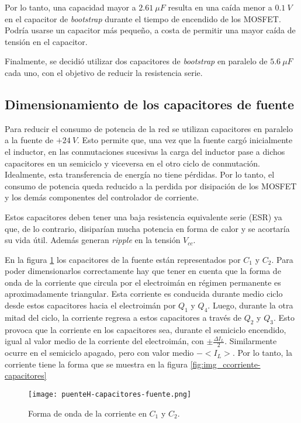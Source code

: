 \noindent Por lo tanto, una capacidad mayor a $2.61 \:\mu F$ resulta en una caída menor a $0.1\:V$ en el capacitor de \textsl{bootstrap} durante el tiempo de encendido de los MOSFET. Podría usarse un capacitor más pequeño, a costa de permitir una mayor caída de tensión en el capacitor. 

\noindent Finalmente, se decidió utilizar dos capacitores de \textsl{bootstrap} en paralelo de $5.6 \:\mu F$ cada uno, con el objetivo de reducir la resistencia serie.

\subsection{Dimensionamiento de los capacitores de fuente}

\noindent Para reducir el consumo de potencia de la red se utilizan capacitores en paralelo a la fuente de $+24\:V$. Esto permite que, una vez que la fuente cargó inicialmente el inductor, en las conmutaciones sucesivas la carga del inductor pase a dichos capacitores en un semiciclo y viceversa en el otro ciclo de conmutación. Idealmente, esta transferencia de energía no tiene pérdidas. Por lo tanto, el consumo de potencia queda reducido a la perdida por disipación de los MOSFET y los demás componentes del controlador de corriente. 

\noindent Estos capacitores deben tener una baja resistencia equivalente serie (ESR) ya que, de lo contrario, disiparían mucha potencia en forma de calor y se acortaría su vida útil. Además generan \textsl{ripple} en la tensión $V_{cc}$.

\noindent En la figura \ref{fig:img_puenteH-capacitores-fuente.png} los capacitores de la fuente están representados por $C_1$ y $C_2$. Para poder dimensionarlos correctamente hay que tener en cuenta que la forma de onda de la corriente que circula por el electroimán en régimen permanente es aproximadamente triangular. Esta corriente es conducida durante medio ciclo desde estos capacitores hacia el electroimán por $Q_1$ y $Q_4$. Luego, durante la otra mitad del ciclo, la corriente regresa a estos capacitores a través de $Q_2$ y $Q_3$. Esto provoca que la corriente en los capacitores sea, durante el semiciclo encendido, igual al valor medio de la corriente del electroimán, con $ \pm \frac{\Delta I_L}{2}$. Similarmente ocurre en el semiciclo apagado, pero con valor medio $-<I_L>$.  Por lo tanto,  la corriente tiene la forma que se muestra en la figura \ref{fig:img_ccorriente-capacitores}

\begin{figure}[H]
	\centering
	\texttt{[image: puenteH-capacitores-fuente.png]}
	\caption{Forma de onda de la corriente en $C_1$ y $C_2$.}
	\label{fig:img_puenteH-capacitores-fuente.png}
\end{figure}

